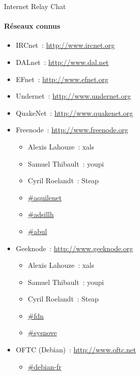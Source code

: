 \begin{frame}[fragile]{Internet Relay Chat}
\framesubtitle{Réseaux connus}
\begin{itemize}[<+->]
 \item IRCnet~: \url{http://www.ircnet.org}
 \item DALnet~: \url{http://www.dal.net}
 \item EFnet~: \url{http://www.efnet.org}
 \item Undernet~: \url{http://www.undernet.org}
 \item QuakeNet~: \url{http://www.quakenet.org}
 \item Freenode~: \url{http://www.freenode.org}
 \begin{itemize}[<+->]
  \item Alexis Lahouze~: xals
  \item Samuel Thibault~: youpi
  \item Cyril Roelandt~: Steap
  \item \url{\#aquilenet}
  \item \url{\#adsillh}
  \item \url{\#abul}
 \end{itemize}
 \item Geeknode~: \url{http://www.geeknode.org}
 \begin{itemize}[<+->]
  \item Alexis Lahouze~: xals
  \item Samuel Thibault~: youpi
  \item Cyril Roelandt~: Steap
  \item \url{\#fdn}
  \item \url{\#sysnove}
 \end{itemize}
 \item OFTC (Debian)~: \url{http://www.oftc.net}
 \begin{itemize}[<+->]
  \item \url{\#debian-fr}
 \end{itemize}
\end{itemize}
\end{frame}

